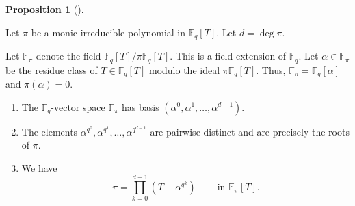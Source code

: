 \documentclass[numbers=enddot,12pt,final,onecolumn,notitlepage]{scrartcl}%
\theoremstyle{definition}
\newtheorem{prop}[theo]{Proposition}
\newenvironment{proposition}[1][]
{\begin{prop}[#1]\begin{leftbar}}
{\end{leftbar}\end{prop}}
\let\prodnonlimits\prod
\renewcommand{\prod}{\prodnonlimits\limits}
\begin{document}
\begin{proposition}
\label{prop.F.u(pi).lem1}Let $\pi$ be a monic irreducible polynomial in
$\mathbb{F}_{q}\left[  T\right]  $. Let $d=\deg\pi$.

Let $\mathbb{F}_{\pi}$ denote the field $\mathbb{F}_{q}\left[  T\right]
/\pi\mathbb{F}_{q}\left[  T\right]  $. This is a field extension of
$\mathbb{F}_{q}$. Let $\alpha\in\mathbb{F}_{\pi}$ be the residue class of
$T\in\mathbb{F}_{q}\left[  T\right]  $ modulo the ideal $\pi\mathbb{F}%
_{q}\left[  T\right]  $. Thus, $\mathbb{F}_{\pi}=\mathbb{F}_{q}\left[
\alpha\right]  $ and $\pi\left(  \alpha\right)  =0$.

\begin{enumerate}
\item[\textbf{(a)}] The $\mathbb{F}_{q}$-vector space $\mathbb{F}_{\pi}$ has
basis $\left(  \alpha^{0},\alpha^{1},\ldots,\alpha^{d-1}\right)  $.

\item[\textbf{(b)}] The elements $\alpha^{q^{0}},\alpha^{q^{1}},\ldots
,\alpha^{q^{d-1}}$ are pairwise distinct and are precisely the roots of $\pi$.

\item[\textbf{(c)}] We have%
\begin{equation}
\pi=\prod_{k=0}^{d-1}\left(  T-\alpha^{q^{k}}\right)
\ \ \ \ \ \ \ \ \ \ \text{in }\mathbb{F}_{\pi}\left[  T\right]  .
\label{eq.prop.F.u(pi).lem1.c}%
\end{equation}

\end{enumerate}
\end{proposition}
\end{document}
